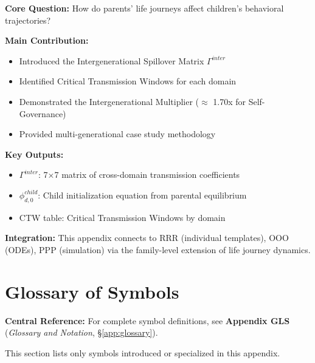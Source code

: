\begin{tcolorbox}[colback=green!10!white, colframe=green!75!black,
    title=\textbf{Appendix BI: Summary}]

\textbf{Core Question:} How do parents' life journeys affect children's behavioral trajectories?

\textbf{Main Contribution:}
\begin{itemize}[nosep]
    \item Introduced the Intergenerational Spillover Matrix $\Gamma^{inter}$
    \item Identified Critical Transmission Windows for each domain
    \item Demonstrated the Intergenerational Multiplier ($\approx$ 1.70x for Self-Governance)
    \item Provided multi-generational case study methodology
\end{itemize}

\textbf{Key Outputs:}
\begin{itemize}[nosep]
    \item $\Gamma^{inter}$: 7×7 matrix of cross-domain transmission coefficients
    \item $\phi^{child}_{d,0}$: Child initialization equation from parental equilibrium
    \item CTW table: Critical Transmission Windows by domain
\end{itemize}

\textbf{Integration:} This appendix connects to RRR (individual templates), OOO (ODEs),
PPP (simulation) via the family-level extension of life journey dynamics.

\end{tcolorbox}


\section{Glossary of Symbols}
\label{sec:BI-glossary}

\begin{tcolorbox}[colback=blue!5!white, colframe=blue!75!black]
\textbf{Central Reference:} For complete symbol definitions, see
\textbf{Appendix GLS} (\textit{Glossary and Notation}, \S\ref{app:glossary}).

This section lists only symbols introduced or specialized in this appendix.
\end{tcolorbox}

